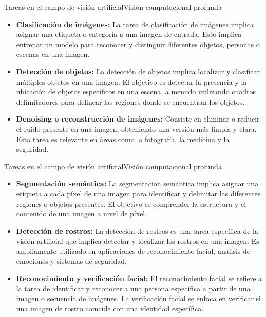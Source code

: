 \documentclass[10pt,border=3pt,tikz]{beamer}
\begin{document}
    \begin{frame}{Tareas en el campo de visión artificial}{Visión computacional profunda}
        \begin{itemize}
            \item \textbf{Clasificación de imágenes:} La tarea de clasificación de imágenes implica asignar una etiqueta o categoría a una imagen de entrada. Esto implica entrenar un modelo para reconocer y distinguir diferentes objetos, personas o escenas en una imagen.
            \item \textbf{Detección de objetos:} La detección de objetos implica localizar y clasificar múltiples objetos en una imagen. El objetivo es detectar la presencia y la ubicación de objetos específicos en una escena, a menudo utilizando cuadros delimitadores para delinear las regiones donde se encuentran los objetos.
            \item \textbf{Denoising o reconstrucción de imágenes:} Consiste en eliminar o reducir el ruido presente en una imagen, obteniendo una versión más limpia y clara. Esta tarea es relevante en áreas como la fotografía, la medicina y la seguridad.
        \end{itemize}
    \end{frame}
    
    \begin{frame}{Tareas en el campo de visión artificial}{Visión computacional profunda}
        \begin{itemize}
            \item \textbf{Segmentación semántica:} La segmentación semántica implica asignar una etiqueta a cada píxel de una imagen para identificar y delimitar las diferentes regiones o objetos presentes. El objetivo es comprender la estructura y el contenido de una imagen a nivel de píxel.
            \item \textbf{Detección de rostros:} La detección de rostros es una tarea específica de la visión artificial que implica detectar y localizar los rostros en una imagen. Es ampliamente utilizado en aplicaciones de reconocimiento facial, análisis de emociones y sistemas de seguridad.
            \item \textbf{Reconocimiento y verificación facial:} El reconocimiento facial se refiere a la tarea de identificar y reconocer a una persona específica a partir de una imagen o secuencia de imágenes. La verificación facial se enfoca en verificar si una imagen de rostro coincide con una identidad específica.
        \end{itemize}
    \end{frame}
    
\end{document}
